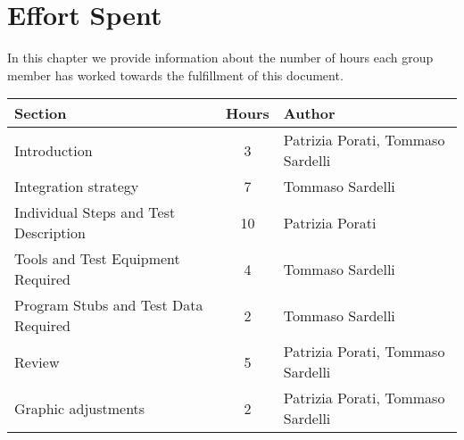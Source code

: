 \pagebreak
\section{Effort Spent}

In this chapter we provide information about the number of hours each group member has worked towards the fulfillment of this document.
\begin{center}
	\vspace{0.2cm}
	\begin{tabular}{ l c l } 
		\hline
		Section 					& Hours & Author \\ 
		\hline
		Introduction								& 3 	& Patrizia Porati, Tommaso Sardelli	\\
		Integration strategy						& 7 	& Tommaso Sardelli	\\
		Individual Steps and Test Description 		& 10 	& Patrizia Porati \\ 
		Tools and Test Equipment Required 			& 4	 	& Tommaso Sardelli \\
		Program Stubs and Test Data Required		& 2		& Tommaso Sardelli \\
		Review										& 5		& Patrizia Porati, Tommaso Sardelli	\\
		Graphic adjustments     				    & 2		& Patrizia Porati, Tommaso Sardelli	\\
		\hline
	\end{tabular}
\end{center}
